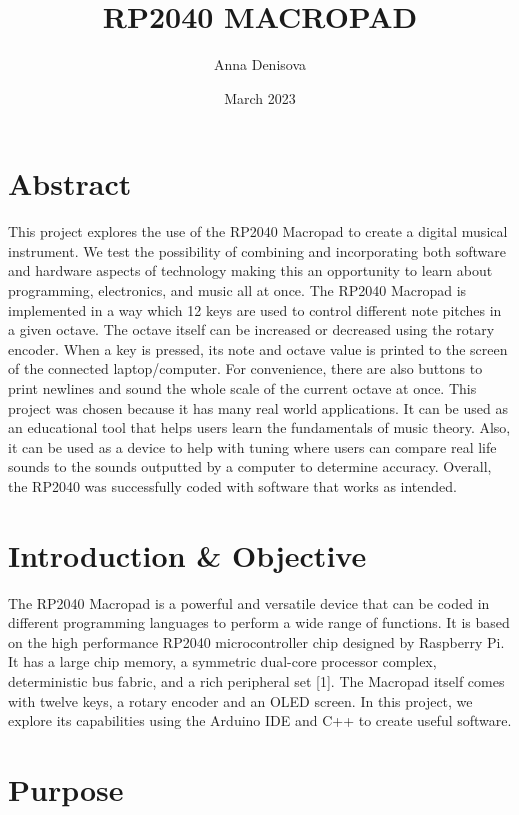 \documentclass{article}
\title{RP2040 MACROPAD}
\author{Anna Denisova}
\date{March 2023}
\begin{document}
\maketitle
\tableofcontents

\newpage

\section{Abstract}

\hspace{1cm} This project explores the use of the RP2040 Macropad to create a digital musical instrument. We test the possibility of combining and incorporating both software and hardware aspects of technology making this an opportunity to learn about programming, electronics, and music all at once. The RP2040 Macropad is implemented in a way which 12 keys are used to control different note pitches in a given octave. The octave itself can be increased or decreased using the rotary encoder. When a key is pressed, its note and octave value is printed to the screen of the connected laptop/computer. For convenience, there are also buttons to print newlines and sound the whole scale of the current octave at once. This project was chosen because it has many real world applications. It can be used as an educational tool that helps users learn the fundamentals of music theory. Also, it can be used as a device to help with tuning where users can compare real life sounds to the sounds outputted by a computer to determine accuracy. Overall, the RP2040 was successfully coded with software that works as intended.

\section{Introduction \& Objective}

\hspace{1cm} The RP2040 Macropad is a powerful and versatile device that can be coded in different programming languages to perform a wide range of functions. It is based on the high performance RP2040 microcontroller chip designed by Raspberry Pi. It has a large chip memory, a symmetric dual-core processor complex, deterministic bus fabric, and a rich peripheral set [1]. The Macropad itself comes with twelve keys, a rotary encoder and an OLED screen. In this project, we explore its capabilities using the Arduino IDE and C++ to create useful software. 

\section{Purpose}
\end{document}
